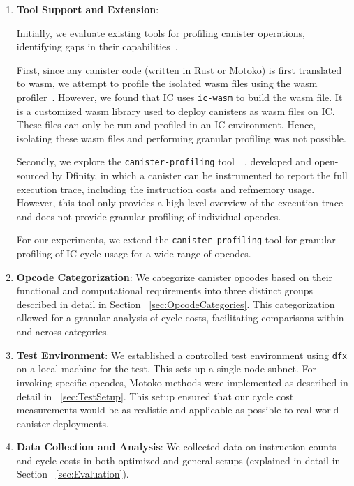 \begin{enumerate}
    \item \textbf{Tool Support and Extension}:
    
    Initially, we evaluate existing tools for profiling canister operations, identifying gaps in their capabilities~\cite{canisterProfiling}. 
    
    First, since any canister code (written in Rust or Motoko) is first translated to wasm, we attempt to profile the isolated wasm files using the wasm profiler~\cite{wasmProfiling}. However, we found that IC uses \texttt{ic-wasm} to build the wasm file. It is a customized wasm library used to deploy canisters as wasm files on IC. These files can only be run and profiled in an IC environment. Hence, isolating these wasm files and performing granular profiling was not possible.
    
    Secondly, we explore the \texttt{canister-profiling} tool~\cite{canisterProfiling}~\cite{canisterProfiling}, developed and open-sourced by Dfinity, in which a canister can be instrumented to report the full execution trace, including the instruction costs and refmemory usage. However, this tool only provides a high-level overview of the execution trace and does not provide granular profiling of individual opcodes.
    
    For our experiments, we extend the \texttt{canister-profiling} tool for granular profiling of IC cycle usage for a wide range of opcodes.
    
    \item \textbf{Opcode Categorization}: We categorize canister opcodes based on their functional and computational requirements into three distinct groups described in detail in Section ~\ref{sec:OpcodeCategories}. This categorization allowed for a granular analysis of cycle costs, facilitating comparisons within and across categories.
    
    \item \textbf{Test Environment}: We established a controlled test environment using \texttt{dfx} on a local machine for the test. This sets up a single-node subnet. For invoking specific opcodes, Motoko methods were implemented as described in detail in  ~\ref{sec:TestSetup}. This setup ensured that our cycle cost measurements would be as realistic and applicable as possible to real-world canister deployments.
    
    \item \textbf{Data Collection and Analysis}: We collected data on instruction counts and cycle costs in both optimized and general setups (explained in detail in Section ~\ref{sec:Evaluation}).
\end{enumerate}


